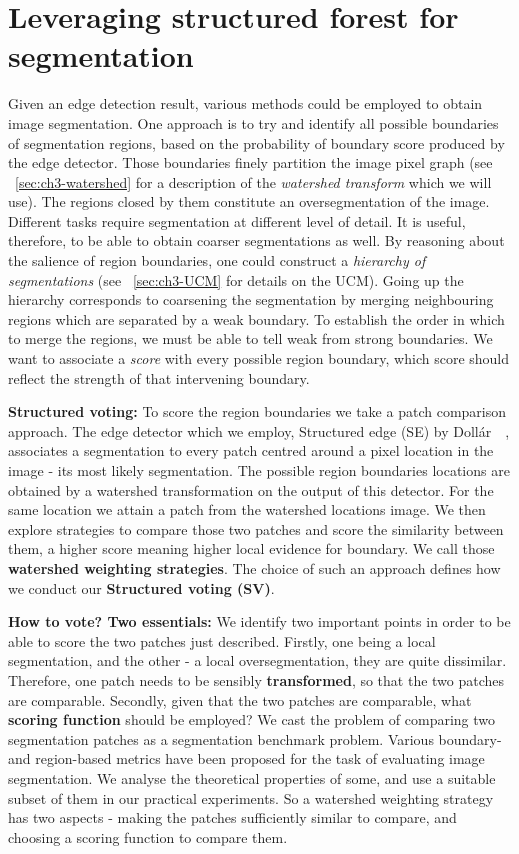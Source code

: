 \chapter{Leveraging structured forest for segmentation}
\label{Chapter4}
Given an edge detection result, various methods could be employed to obtain image segmentation.  One approach is to try and identify all possible boundaries of segmentation regions, based on the probability of boundary score produced by the edge detector. Those boundaries %
finely partition the image pixel graph (see \textsection~\ref{sec:ch3-watershed} for a description of the \textit{watershed transform} which we will use). The regions closed by them constitute an oversegmentation of the image. Different tasks require segmentation at different level of detail. It is useful, therefore, to be able to obtain coarser segmentations as well. 
By reasoning about the salience of region boundaries, one could construct a \textit{hierarchy of segmentations} (see \textsection~\ref{sec:ch3-UCM} for details on the UCM). Going up the hierarchy corresponds to coarsening the segmentation by merging neighbouring regions which are separated by a weak boundary. To establish the order in which to merge the regions, we must be able to tell weak from strong boundaries. We want to associate a \textit{score} with every possible region boundary, which score should reflect the strength of that intervening boundary.

\textbf{Structured voting:} To score the region boundaries we take a patch comparison approach. The edge detector which we employ, Structured edge (SE) by Doll\'ar~\etal~\cite{DollarICCV13edges}, associates a segmentation to every patch centred around a pixel location in the image - its most likely segmentation. The possible region boundaries locations are obtained by a watershed transformation on the output of this detector. For the same location we attain a patch from the watershed locations image. We then explore strategies to compare those two patches and score the similarity between them, a higher score meaning higher local evidence for boundary. We call those \textbf{watershed weighting strategies}. The choice of such an approach defines how we conduct our \textbf{Structured voting (SV)}.

\textbf{How to vote? Two essentials:} We identify two important points in order to be able to score the two patches just described. 
Firstly, one being a local segmentation, and the other - a local oversegmentation, they are quite dissimilar. Therefore, one patch needs to be sensibly \textbf{transformed}, so that the two patches are comparable. 
Secondly, given that the two patches are comparable, what \textbf{scoring function} should be employed? We cast the problem of comparing two segmentation patches as a segmentation benchmark problem. Various boundary- and region-based metrics have been proposed for the task of evaluating image segmentation. We analyse the theoretical properties of some, and use a suitable %
subset of them in our practical experiments. 
So a watershed weighting strategy has two aspects - making the patches sufficiently similar to compare, and choosing a scoring function to compare them.

